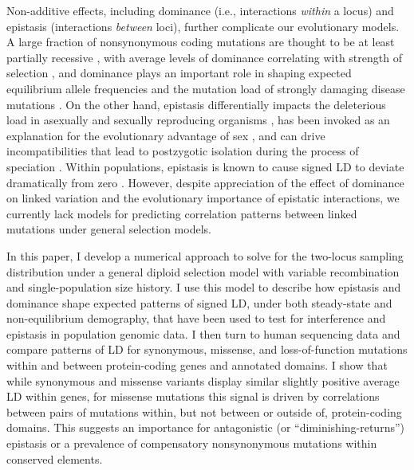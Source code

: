 \documentclass[]{article}
\begin{document}
Non-additive effects, including dominance (i.e., interactions \emph{within} a
locus) and epistasis (interactions \emph{between} loci), further complicate our
evolutionary models. A large fraction of nonsynonymous coding mutations are
thought to be at least partially recessive \citep{Agrawal2011-wb,
Huber2018-cp}, with average levels of dominance correlating with strength of
selection \citep{Kacser1981-nc}, and dominance plays an important role in
shaping expected equilibrium allele frequencies and the mutation load of
strongly damaging disease mutations \citep{Clark1998-kq}. On the other hand,
epistasis differentially impacts the deleterious load in asexually and sexually
reproducing organisms \citep{Kimura1966-gc, Kondrashov1995-va}, has been
invoked as an explanation for the evolutionary advantage of sex
\citep{Kondrashov1982-sf, Charlesworth1990-kw, Barton1998-lu}, and can drive
incompatibilities that lead to postzygotic isolation during the process of
speciation \citep{Turelli2000-kz}. Within populations, epistasis is known to
cause signed LD to deviate dramatically from zero \citep{Charlesworth1990-kw,
Kondrashov1995-va}. However, despite appreciation of the effect of dominance on
linked variation \citep{Turelli2000-kz, Zhao2016-bb} and the evolutionary
importance of epistatic interactions, we currently lack models for predicting
correlation patterns between linked mutations under general selection models.

In this paper, I develop a numerical approach to solve for the two-locus
sampling distribution under a general diploid selection model with variable
recombination and single-population size history. I use this model to describe
how epistasis and dominance shape expected patterns of signed LD, under both
steady-state and non-equilibrium demography, that have been used to test for
interference and epistasis in population genomic data. I then turn to human
sequencing data and compare patterns of LD for synonymous, missense, and
loss-of-function mutations within and between protein-coding genes and
annotated domains. I show that while synonymous and missense variants display
similar slightly positive average LD within genes, for missense mutations this
signal is driven by correlations between pairs of mutations within, but not
between or outside of, protein-coding domains.
This suggests an importance for antagonistic (or ``diminishing-returns'')
epistasis or a prevalence of compensatory
nonsynonymous mutations within conserved elements.
\end{document}

